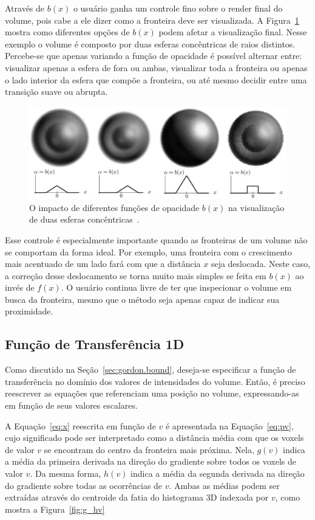 	Através de $b(x)$ o usuário ganha um controle fino sobre o render final do volume, pois cabe a ele dizer como a fronteira deve ser visualizada. A Figura~\ref{fig:g_bx} mostra como diferentes opções de $b(x)$ podem afetar a visualização final. Nesse exemplo o volume é composto por duas esferas concêntricas de raios distintos. Percebe-se que apenas variando a função de opacidade é possível alternar entre: visualizar apenas a esfera de fora ou ambas, visualizar toda a fronteira ou apenas o lado interior da esfera que compõe a fronteira, ou até mesmo decidir entre uma transição suave ou abrupta.
	
\begin{figure}[h]
	\centering
	\includegraphics[width=1\textwidth]{images/g_bx}
	\caption{O impacto de diferentes funções de opacidade $b(x)$ na visualização de duas esferas concêntricas~\cite{gordon}.}
	\label{fig:g_bx}
\end{figure}

	Esse controle é especialmente importante quando as fronteiras de um volume não se comportam da forma ideal. Por exemplo, uma fronteira com o crescimento mais acentuado de um lado fará com que a distância $x$ seja deslocada. Neste caso, a correção desse deslocamento se torna muito mais simples se feita em $b(x)$ ao invés de $f(x)$. O usuário continua livre de ter que inspecionar o volume em busca da fronteira, mesmo que o método seja apenas capaz de indicar sua proximidade.
	
\subsection{Função de Transferência 1D}
\label{subsec:gordon.1d}
	Como discutido na Seção~\ref{sec:gordon.bound}, deseja-se especificar a função de transferência no domínio dos valores de intensidades do volume. Então, é preciso reescrever as equações que referenciam uma posição no volume, expressando-as em função de seus valores escalares.
	
	A Equação~\eqref{eq:x} reescrita em função de $v$ é apresentada na Equação~\eqref{eq:pv}, cujo significado pode ser interpretado como a distância média com que os voxels de valor $v$ se encontram do centro da fronteira mais próxima. Nela, $g(v)$ indica a média da primeira derivada na direção do gradiente sobre todos os voxels de valor $v$. Da mesma forma, $h(v)$ indica a média da segunda derivada na direção do gradiente sobre todas as ocorrências de $v$. Ambas as médias podem ser extraídas através do centroide da fatia do histograma 3D indexada por $ v $, como mostra a Figura~\ref{fig:g_hv}
	
